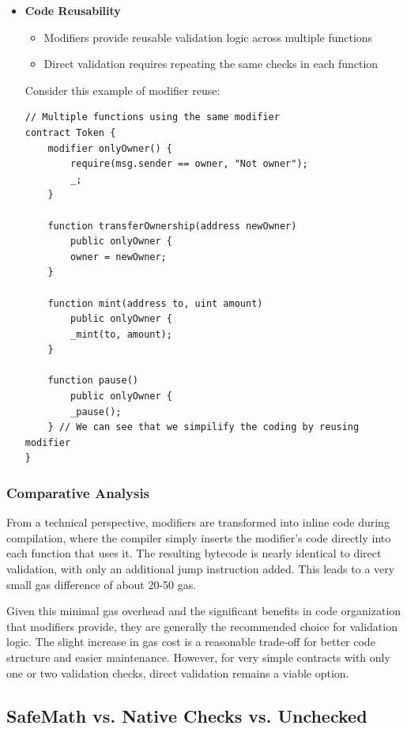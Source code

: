 \documentclass[conference]{IEEEtran}
\begin{document}
\begin{itemize}
    \item \textbf{Code Reusability}
    \begin{itemize}
        \item Modifiers provide reusable validation logic across multiple functions
        \item Direct validation requires repeating the same checks in each function
    \end{itemize}
    
    Consider this example of modifier reuse:
    \begin{lstlisting}[style=solidity]
// Multiple functions using the same modifier
contract Token {
    modifier onlyOwner() {
        require(msg.sender == owner, "Not owner");
        _;
    }
    
    function transferOwnership(address newOwner) 
        public onlyOwner {
        owner = newOwner;
    }
    
    function mint(address to, uint amount) 
        public onlyOwner {
        _mint(to, amount);
    }
    
    function pause() 
        public onlyOwner {
        _pause();
    } // We can see that we simpilify the coding by reusing modifier
}
    \end{lstlisting}
\end{itemize}

\subsubsection{Comparative Analysis}
From a technical perspective, modifiers are transformed into inline code during compilation, where the compiler simply inserts the modifier's code directly into each function that uses it. The resulting bytecode is nearly identical to direct validation, with only an additional jump instruction added. This leads to a very small gas difference of about 20-50 gas.

Given this minimal gas overhead and the significant benefits in code organization that modifiers provide, they are generally the recommended choice for validation logic. The slight increase in gas cost is a reasonable trade-off for better code structure and easier maintenance. However, for very simple contracts with only one or two validation checks, direct validation remains a viable option.

\vspace{1em}
\subsection{SafeMath vs. Native Checks vs. Unchecked}
\end{document}
